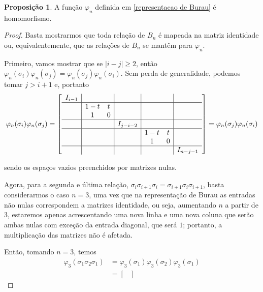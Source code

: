 \documentclass[a4paper,portuguese,11pt,twoside, leqno]{book}
\theoremstyle{definition}
\newtheorem{prop}{Proposição}[section]
\begin{document}
	\begin{prop}
		\label{Burau e homomorfismo}
		A função $\varphi_n$ definida em \eqref{representacao de Burau} é homomorfismo. 
	\end{prop}
	\begin{proof}
		Basta mostrarmos que toda relação de $B_n$ é mapeada na matriz identidade ou, equivalentemente, que as relações de $B_n$ se mantêm para $\varphi_n$. 
		\par\vspace{0.3cm} Primeiro, vamos mostrar que se $|i - j|\geq 2$, então $\varphi_n(\sigma_i)\varphi_n(\sigma_j) = \varphi_n(\sigma_j)\varphi_n(\sigma_i)$. Sem perda de generalidade, podemos tomar $j>i+1$ e, portanto
		\begin{equation*}
		\varphi_n(\sigma_i)\varphi_n(\sigma_j) = 
		\left[ 
		\begin{array}{c|cc|c|cc|c}
		I_{i-1} & & & & & & \\
		\hline
		& 1-t & t & & & & \\
		& 1 & 0 & & & & \\
		\hline
		& & & I_{j-i-2} & & &\\
		\hline
		& & & & 1-t & t &\\
		& & & & 1 & 0 & \\
		\hline 
		& & & & & & I_{n-j-1} 
		\end{array}	
		\right] = \varphi_n(\sigma_j)\varphi_n(\sigma_i)
		\end{equation*}
		\par\vspace{0.3cm} sendo os espaços vazios preenchidos por matrizes nulas.
		\par\vspace{0.3cm} Agora, para a segunda e última relação, $\sigma_i\sigma_{i+1}\sigma_i = \sigma_{i+1}\sigma_i\sigma_{i+1}$, basta considerarmos o caso $n=3$, uma vez que na representação de Burau as entradas não nulas correspondem a matrizes identidade, ou seja, aumentando $n$ a partir de $3$, estaremos apenas acrescentando uma nova linha e uma nova coluna que serão ambas nulas com exceção da entrada diagonal, que será $1$; portanto, a multiplicação das matrizes não é afetada. 
		\par\vspace{0.3cm} Então, tomando $n = 3$, temos
		\begin{align*}
		\varphi_3(\sigma_1\sigma_2\sigma_1) &= \varphi_3(\sigma_1)\varphi_3(\sigma_2)\varphi_3(\sigma_1) \\ &= 
		\begin{bmatrix}

\end{bmatrix}
\end{align*}
\end{proof}
\end{document}

